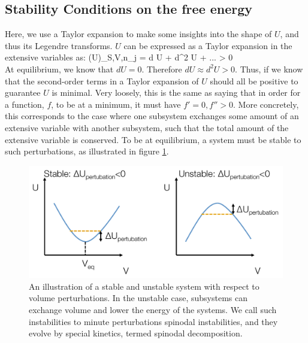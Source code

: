 \documentclass[12pt]{article}
\begin{document}
\subsection{Stability Conditions on the free energy} 
Here, we use a Taylor expansion to make some insights into the shape of $U$, and thus its Legendre transforms. $U$ can be expressed as a Taylor expansion in the extensive variables as:
\eqs
(\Delta U)_{S,V,n_j} = d U + d^2 U + ... > 0\\
\eqe
At equilibrium, we know that $d U = 0$. Therefore $dU \approx d^2U > 0$.  Thus, if we know that the second-order terms in a Taylor expansion of $U$ should all be positive to guarantee $U$ is minimal. Very loosely, this is the same as saying that in order for a function, $f$, to be at a minimum, it must have $f'=0,f''>0$. More concretely, this corresponds to the case where one subsystem exchanges some amount of an extensive variable with another subsystem, such that the total amount of the extensive variable is conserved. To be at equilibrium, a system must be stable to such perturbations, as illustrated in figure \ref{stability}. 
\begin{figure}[h]
\centering
\includegraphics[width=\textwidth]{StabilityWRTPerturbations}
\caption{An illustration of a stable and unstable system with respect to volume perturbations. In the unstable case, subsystems can exchange volume and lower the energy of the systems. We call such instabilities to minute perturbations spinodal instabilities, and they evolve by special kinetics, termed spinodal decomposition.}
\label{stability}
\end{figure}
\end{document}

